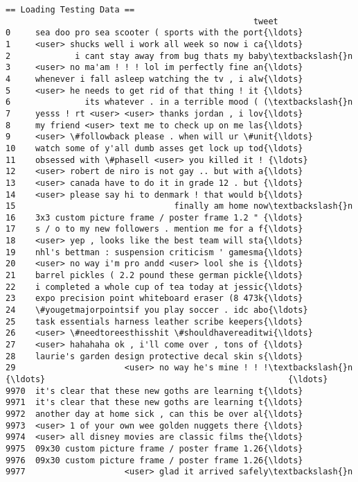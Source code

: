 \documentclass[11pt]{article}
\begin{document}
    \begin{Verbatim}[commandchars=\\\{\}]
 == Loading Testing Data ==
                                                  tweet
0     sea doo pro sea scooter ( sports with the port{\ldots}
1     <user> shucks well i work all week so now i ca{\ldots}
2             i cant stay away from bug thats my baby\textbackslash{}n
3     <user> no ma'am ! ! ! lol im perfectly fine an{\ldots}
4     whenever i fall asleep watching the tv , i alw{\ldots}
5     <user> he needs to get rid of that thing ! it {\ldots}
6               its whatever . in a terrible mood ( (\textbackslash{}n
7     yesss ! rt <user> <user> thanks jordan , i lov{\ldots}
8     my friend <user> text me to check up on me las{\ldots}
9     <user> \#followback please . when will ur \#unit{\ldots}
10    watch some of y'all dumb asses get lock up tod{\ldots}
11    obsessed with \#phasell <user> you killed it ! {\ldots}
12    <user> robert de niro is not gay .. but with a{\ldots}
13    <user> canada have to do it in grade 12 . but {\ldots}
14    <user> please say hi to denmark ! that would b{\ldots}
15                                finally am home now\textbackslash{}n
16    3x3 custom picture frame / poster frame 1.2 " {\ldots}
17    s / o to my new followers . mention me for a f{\ldots}
18    <user> yep , looks like the best team will sta{\ldots}
19    nhl's bettman : suspension criticism ' gamesma{\ldots}
20    <user> no way i'm pro andd <user> lool she is {\ldots}
21    barrel pickles ( 2.2 pound these german pickle{\ldots}
22    i completed a whole cup of tea today at jessic{\ldots}
23    expo precision point whiteboard eraser (8 473k{\ldots}
24    \#yougetmajorpointsif you play soccer . idc abo{\ldots}
25    task essentials harness leather scribe keepers{\ldots}
26    <user> \#needtoreesthisshit \#shouldhavereaditwi{\ldots}
27    <user> hahahaha ok , i'll come over , tons of {\ldots}
28    laurie's garden design protective decal skin s{\ldots}
29                      <user> no way he's mine ! ! !\textbackslash{}n
{\ldots}                                                 {\ldots}
9970  it's clear that these new goths are learning t{\ldots}
9971  it's clear that these new goths are learning t{\ldots}
9972  another day at home sick , can this be over al{\ldots}
9973  <user> 1 of your own wee golden nuggets there {\ldots}
9974  <user> all disney movies are classic films the{\ldots}
9975  09x30 custom picture frame / poster frame 1.26{\ldots}
9976  09x30 custom picture frame / poster frame 1.26{\ldots}
9977                    <user> glad it arrived safely\textbackslash{}n

\end{Verbatim}
\end{document}
